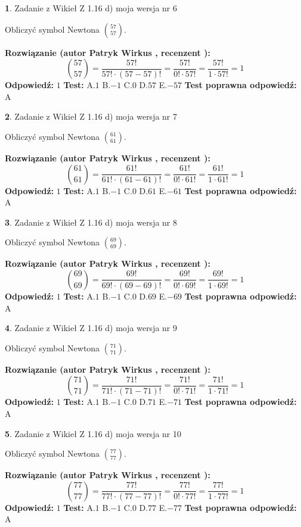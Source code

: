 \documentclass[12pt, a4paper]{article}
\theoremstyle{definition} %
\newtheorem{zad}{}
\newcommand{\zadStart}[1]{\begin{zad}#1\newline}
\newcommand{\zadStop}{\end{zad}}
\newcommand{\rozwStart}[2]{\noindent \textbf{Rozwiązanie (autor #1 , recenzent #2): }\newline}
\newcommand{\rozwStop}{\newline}
\newcommand{\odpStart}{\noindent \textbf{Odpowiedź:}\newline}
\newcommand{\odpStop}{\newline}
\newcommand{\testStart}{\noindent \textbf{Test:}\newline}
\newcommand{\testStop}{\newline}
\newcommand{\kluczStart}{\noindent \textbf{Test poprawna odpowiedź:}\newline}
\newcommand{\kluczStop}{\newline}
\begin{document}
\zadStart{Zadanie z Wikieł Z 1.16 d) moja wersja nr 6}

Obliczyć symbol Newtona ${57 \choose 57}$.
\zadStop
\rozwStart{Patryk Wirkus}{}
$${57 \choose 57} = \frac{57!}{57! \cdot (57-57)!} = \frac{57!}{0! \cdot 57!} = \frac{57!}{1 \cdot 57!} = 1$$
\rozwStop
\odpStart
$1$
\odpStop
\testStart
A.$1$ B.$-1$ C.$0$ D.$57$ E.$-57$
\testStop
\kluczStart
A
\kluczStop



\zadStart{Zadanie z Wikieł Z 1.16 d) moja wersja nr 7}

Obliczyć symbol Newtona ${61 \choose 61}$.
\zadStop
\rozwStart{Patryk Wirkus}{}
$${61 \choose 61} = \frac{61!}{61! \cdot (61-61)!} = \frac{61!}{0! \cdot 61!} = \frac{61!}{1 \cdot 61!} = 1$$
\rozwStop
\odpStart
$1$
\odpStop
\testStart
A.$1$ B.$-1$ C.$0$ D.$61$ E.$-61$
\testStop
\kluczStart
A
\kluczStop



\zadStart{Zadanie z Wikieł Z 1.16 d) moja wersja nr 8}

Obliczyć symbol Newtona ${69 \choose 69}$.
\zadStop
\rozwStart{Patryk Wirkus}{}
$${69 \choose 69} = \frac{69!}{69! \cdot (69-69)!} = \frac{69!}{0! \cdot 69!} = \frac{69!}{1 \cdot 69!} = 1$$
\rozwStop
\odpStart
$1$
\odpStop
\testStart
A.$1$ B.$-1$ C.$0$ D.$69$ E.$-69$
\testStop
\kluczStart
A
\kluczStop



\zadStart{Zadanie z Wikieł Z 1.16 d) moja wersja nr 9}

Obliczyć symbol Newtona ${71 \choose 71}$.
\zadStop
\rozwStart{Patryk Wirkus}{}
$${71 \choose 71} = \frac{71!}{71! \cdot (71-71)!} = \frac{71!}{0! \cdot 71!} = \frac{71!}{1 \cdot 71!} = 1$$
\rozwStop
\odpStart
$1$
\odpStop
\testStart
A.$1$ B.$-1$ C.$0$ D.$71$ E.$-71$
\testStop
\kluczStart
A
\kluczStop



\zadStart{Zadanie z Wikieł Z 1.16 d) moja wersja nr 10}

Obliczyć symbol Newtona ${77 \choose 77}$.
\zadStop
\rozwStart{Patryk Wirkus}{}
$${77 \choose 77} = \frac{77!}{77! \cdot (77-77)!} = \frac{77!}{0! \cdot 77!} = \frac{77!}{1 \cdot 77!} = 1$$
\rozwStop
\odpStart
$1$
\odpStop
\testStart
A.$1$ B.$-1$ C.$0$ D.$77$ E.$-77$
\testStop
\kluczStart
A
\kluczStop
\end{document}
